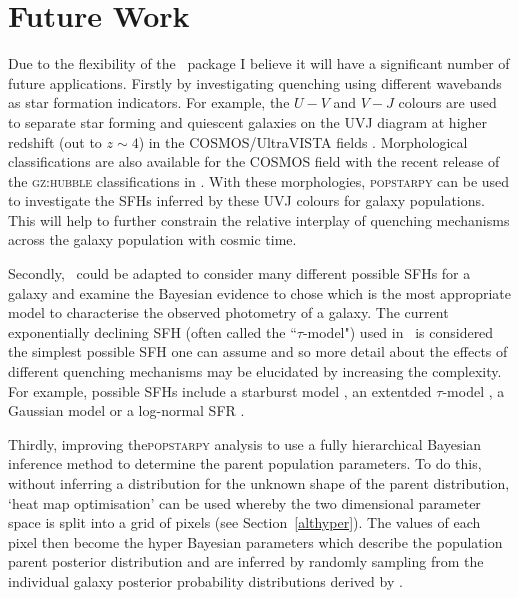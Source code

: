 \section{Future Work}\label{sec:future}

Due to the flexibility of the \starpy\ package I believe it will have a significant number of future applications. Firstly by investigating quenching using different wavebands as star formation indicators. For example, the $U-V$ and $V-J$ colours are used to separate star forming and quiescent galaxies on the UVJ diagram \citep{labbe05, wuyts07, williams09, brammer11, patel12} at higher redshift (out to $z\sim4$) in the COSMOS/UltraVISTA fields \citep[e.g. see work by][]{muzzin13}. Morphological classifications are also available for the COSMOS field with the recent release of the \textsc{gz:hubble} classifications in \cite{willett16}. With these morphologies, \textsc{popstarpy} can be used to investigate the SFHs inferred by these  UVJ colours for galaxy populations. This will help to further constrain the relative interplay of quenching mechanisms across the galaxy population with cosmic time. 

Secondly, \starpy\ could be adapted to consider many different possible SFHs for a galaxy and examine the Bayesian evidence to chose which is the most appropriate model to characterise the observed photometry of a galaxy. The current exponentially declining SFH (often called the ``$\tau$-model") used in \starpy\ is considered the simplest possible SFH one can assume and so more detail about the effects of different quenching mechanisms may be elucidated by increasing the complexity. For example, possible SFHs include a starburst model \citep{kauffmann03}, an extentded $\tau$-model \citep{simha14}, a Gaussian model \citep{feuillet16} or a log-normal SFR \citep{gladders13, abramson16}. 

Thirdly, improving the\textsc{popstarpy} analysis to use a fully hierarchical Bayesian inference method to determine the parent population parameters. To do this, without inferring a distribution for the unknown shape of the parent distribution, `heat map optimisation' can be used whereby the two dimensional parameter space is split into a grid of pixels (see Section~\ref{althyper}). The values of each pixel then become the hyper Bayesian parameters which describe the population parent posterior distribution and are inferred by randomly sampling from the individual galaxy posterior probability distributions derived by \starpy.  

